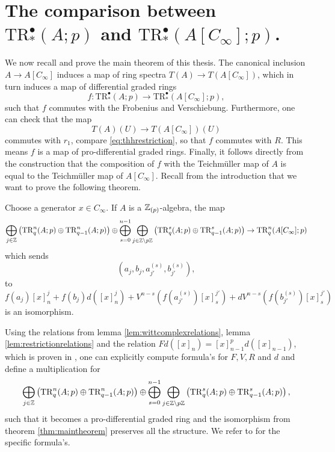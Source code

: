\section{The comparison between $\mathrm{TR}^\bullet_\ast(A;p)$ and
$\mathrm{TR}^\bullet_\ast(A[C_\infty];p)$.}
We now recall and prove the main theorem of this thesis.
The canonical inclusion $A\to A[C_\infty]$
induces a map of ring spectra $T(A)\to T(A[C_\infty])$, which in turn induces a map
of differential graded rings
\[
f:\mathrm{TR}_\ast^\bullet(A;p)\to \mathrm{TR}_\ast^\bullet(A[C_\infty];p),
\]
such that $f$ commutes with the Frobenius and Verschiebung. Furthermore,
one can check that the map 
\[
T(A)(U)\to T(A[C_\infty])(U)
\]
commutes with $r_1$, compare \eqref{eq:thhrestriction}, so that $f$ commutes with $R$.
This means $f$ is a map of pro-differential graded rings. Finally,
it follows directly from the construction that the composition of $f$
with the Teichm\"uller map of $A$ is equal to the Teichm\"uller map of $A[C_\infty]$.
Recall from the introduction that we want to prove the following theorem.
\begin{thm}\label{thm:maintheorem}
Choose a generator $x\in C_\infty$. If $A$ is a $\mathbb{Z}_{(p)}$-algebra, the map
$$\bigoplus_{j\in \mathbb{Z}} \left(\mathrm{TR}^n_q(A;p)\oplus \mathrm{TR}^n_{q-1}(A;p) \right)
\oplus \bigoplus_{s=0}^{n-1}\bigoplus_{j\in \mathbb{Z}\setminus p\mathbb{Z}}
\left( \mathrm{TR}^{s}_q(A;p)\oplus \mathrm{TR}^{s}_{q-1}(A;p)\right)
\rightarrow \mathrm{TR}^n_q(A[C_\infty];p)$$
which sends
$$(a_j, b_j , a_{j'}^{(s)} ,b_{j'}^{(s)}),$$
to
\begin{equation}\label{eq:maintheoremsummands}
f(a_j)[x]^j_n + f(b_j)d([x]^j_n)
+V^{n-s}(f(a_{j'}^{(s)})[x]^{j'}_{s}) + dV^{n-s}(f(b_{j'}^{(s)})[x]^{j'}_{s})
\end{equation}
 is an isomorphism.
\end{thm}
\begin{rem}
Using the relations from lemma \ref{lem:wittcomplexrelations}, lemma
\ref{lem:restrictionrelations} and the relation $Fd([x]_n) = [x]_{n-1}^p d([x]_{n-1})$,
which is proven in \cite[Lemma~1.5.6, \pno~19]{hesselholtacta}, one can 
explicitly compute formula's for $F,V,R$ and $d$ and  define
a multiplication for 
\[
\bigoplus_{j\in \mathbb{Z}} \left(\mathrm{TR}^n_q(A;p)\oplus \mathrm{TR}^n_{q-1}(A;p) \right)
\oplus \bigoplus_{s=0}^{n-1}\bigoplus_{j\in \mathbb{Z}\setminus p\mathbb{Z}}
\left( \mathrm{TR}^{s}_q(A;p)\oplus \mathrm{TR}^{s}_{q-1}(A;p)\right),
\]
such that it becomes a pro-differential graded ring and the
isomorphism from theorem \ref{thm:maintheorem} preserves all the structure.
We refer to \cite[Section~4.2, \pno~24-27]{hmmixed} for the specific formula's.
\end{rem}




